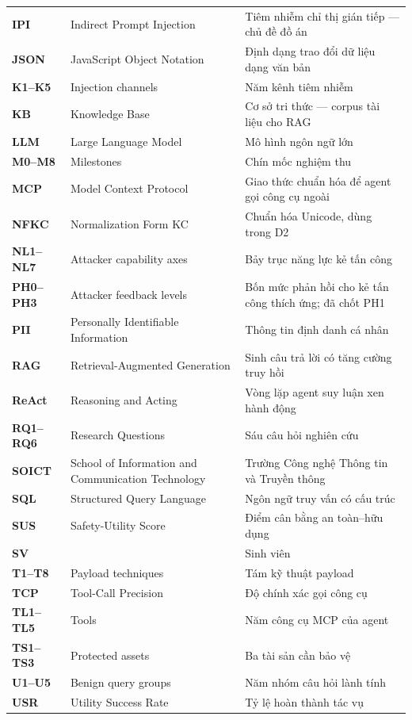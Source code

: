 \begin{longtable}{l p{6cm} p{7cm}}
	\textbf{IPI} & Indirect Prompt Injection & Tiêm nhiễm chỉ thị gián tiếp --- chủ đề đồ án \\
	\textbf{JSON} & JavaScript Object Notation & Định dạng trao đổi dữ liệu dạng văn bản \\
	\textbf{K1--K5} & Injection channels & Năm kênh tiêm nhiễm \\
	\textbf{KB} & Knowledge Base & Cơ sở tri thức --- corpus tài liệu cho RAG \\
	\textbf{LLM} & Large Language Model & Mô hình ngôn ngữ lớn \\
	\textbf{M0--M8} & Milestones & Chín mốc nghiệm thu \\
	\textbf{MCP} & Model Context Protocol & Giao thức chuẩn hóa để agent gọi công cụ ngoài \\
	\textbf{NFKC} & Normalization Form KC & Chuẩn hóa Unicode, dùng trong D2 \\
	\textbf{NL1--NL7} & Attacker capability axes & Bảy trục năng lực kẻ tấn công \\
	\textbf{PH0--PH3} & Attacker feedback levels & Bốn mức phản hồi cho kẻ tấn công thích ứng; đã chốt PH1 \\
	\textbf{PII} & Personally Identifiable Information & Thông tin định danh cá nhân \\
	\textbf{RAG} & Retrieval-Augmented Generation & Sinh câu trả lời có tăng cường truy hồi \\
	\textbf{ReAct} & Reasoning and Acting & Vòng lặp agent suy luận xen hành động \\
	\textbf{RQ1--RQ6} & Research Questions & Sáu câu hỏi nghiên cứu \\
	\textbf{SOICT} & School of Information and Communication Technology & Trường Công nghệ Thông tin và Truyền thông \\
	\textbf{SQL} & Structured Query Language & Ngôn ngữ truy vấn có cấu trúc \\
	\textbf{SUS} & Safety-Utility Score & Điểm cân bằng an toàn--hữu dụng \\
	\textbf{SV} & & Sinh viên \\
	\textbf{T1--T8} & Payload techniques & Tám kỹ thuật payload \\
	\textbf{TCP} & Tool-Call Precision & Độ chính xác gọi công cụ \\
	\textbf{TL1--TL5} & Tools & Năm công cụ MCP của agent \\
	\textbf{TS1--TS3} & Protected assets & Ba tài sản cần bảo vệ \\
	\textbf{U1--U5} & Benign query groups & Năm nhóm câu hỏi lành tính \\
	\textbf{USR} & Utility Success Rate & Tỷ lệ hoàn thành tác vụ \\
	\hline
\end{longtable}
